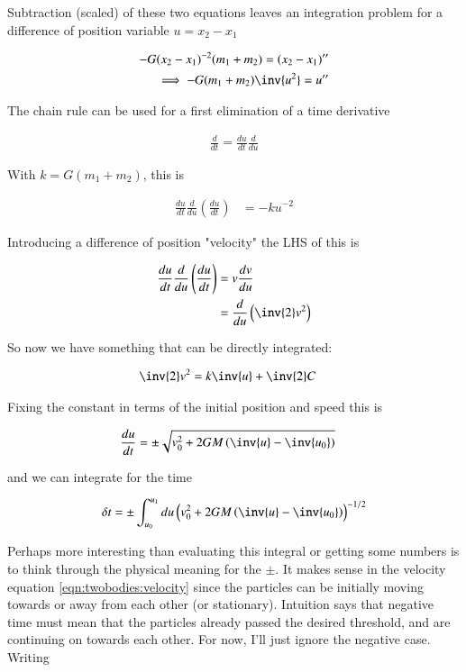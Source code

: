 Subtraction (scaled) of these two equations leaves an integration problem for a difference of position variable $u = x_2 - x_1$

\begin{align*}
- G (x_2 - x_1)^{-2} (m_1 + m_2)= (x_2 - x_1)'' \\
\implies
- G (m_1 + m_2) \inv{u^2} = u'' \\
\end{align*}

The chain rule can be used for a first elimination of a time derivative

\begin{align*}
\frac{d}{dt} = \frac{du}{dt} \frac{d}{du}
\end{align*}

With $k = G(m_1 + m_2)$, this is

\begin{align*}
\frac{du}{dt} \frac{d}{du} \left(\frac{du}{dt}\right) &= -k u^{-2}
\end{align*}

Introducing a difference of position "velocity" the LHS of this is

\begin{align*}
\frac{du}{dt} \frac{d}{du} \left(\frac{du}{dt}\right)
&= v \frac{dv}{du} \\
&= \frac{d}{du} \left( \inv{2}v^2 \right) \\
\end{align*}

So now we have something that can be directly integrated:

\begin{align*}
\inv{2}v^2 &= k \inv{u} + \inv{2}C
\end{align*}

Fixing the constant in terms of the initial position and speed this is

\begin{align}\label{eqn:twobodies:velocity}
\frac{du}{dt} &= \pm \sqrt{v_0^2 + 2 G M \left(\inv{u} - \inv{u_0}\right)}
\end{align}

and we can integrate for the time

\begin{align*}
\delta t 
&= \pm \int_{u_0}^{u_1} du \left(v_0^2 + 2 G M \left(\inv{u} - \inv{u_0}\right)\right)^{-1/2} \\
\end{align*}

Perhaps more interesting than evaluating this integral or getting some numbers is to think through the physical meaning for the $\pm$.  It makes sense in the velocity equation \ref{eqn:twobodies:velocity} since the particles can be initially moving towards or away from each other (or stationary).  Intuition says that negative time must mean that the particles already passed the desired threshold, and are continuing on towards each other.  For now, I'll just ignore the negative case.  Writing

